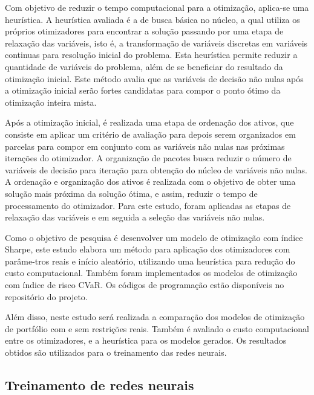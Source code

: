         \ipar Com objetivo de reduzir o tempo computacional para a otimização, aplica-se uma heurística. A heurística avaliada é a de busca básica no núcleo, a qual utiliza os próprios otimizadores para encontrar a solução passando por uma etapa de relaxação das variáveis, isto é, a transformação de variáveis discretas em variáveis continuas para resolução inicial do problema. Esta heurística permite reduzir a quantidade de variáveis do problema, além de se beneficiar do resultado da otimização inicial. Este método avalia que as variáveis de decisão não nulas após a otimização inicial serão fortes candidatas para compor o ponto ótimo da otimização inteira mista. 
        
        \ipar Após a otimização inicial, é realizada uma etapa de ordenação dos ativos, que consiste em aplicar um critério de avaliação para depois serem organizados em parcelas para compor em conjunto com as variáveis não nulas nas próximas iterações do otimizador. A organização de pacotes busca reduzir o número de variáveis de decisão para iteração para obtenção do núcleo de variáveis não nulas. A ordenação e organização dos ativos é realizada com o objetivo de obter uma solução mais próxima da solução ótima, e assim, reduzir o tempo de processamento do otimizador. Para este estudo, foram aplicadas as etapas de relaxação das variáveis e em seguida a seleção das variáveis não nulas.

        \ipar Como o objetivo de pesquisa é desenvolver um modelo de otimização com índice Sharpe, este estudo elabora um método para aplicação dos otimizadores com parâme-tros reais e início aleatório, utilizando uma heurística para redução do custo computacional. Também foram implementados os modelos de otimização com índice de risco CVaR. Os códigos de programação estão disponíveis no repositório do projeto.
        
        \ipar Além disso, neste estudo será realizada a comparação dos modelos de otimização de portfólio com e sem restrições reais. Também é avaliado o custo computacional entre os otimizadores, e a heurística para os modelos gerados. Os resultados obtidos são utilizados para o treinamento das redes neurais.
        
    \subsection{Treinamento de redes neurais}

